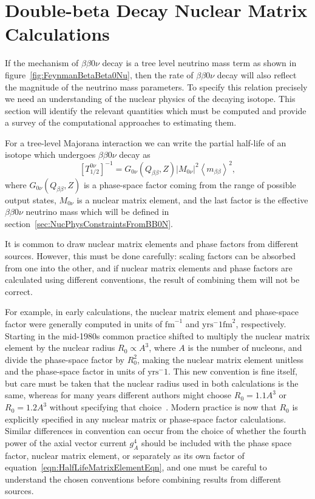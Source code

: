 \section{Double-beta Decay Nuclear Matrix Calculations}\label{sec:NuclearMatrixCalculations}

If the mechanism of $\beta\beta 0\nu$ decay is a tree level neutrino mass term as shown in figure~\ref{fig:FeynmanBetaBeta0Nu}, then the rate of $\beta\beta 0\nu$ decay will also reflect the magnitude of the neutrino mass parameters.  To specify this relation precisely we need an understanding of the nuclear physics of the decaying isotope.  This section will identify the relevant quantities which must be computed and provide a survey of the computational approaches to estimating them.

For a tree-level Majorana interaction we can write the partial half-life of an isotope which undergoes $\beta\beta 0\nu$ decay as
\begin{equation}\label{eqn:HalfLifeMatrixElementEqn}
\left[T^{0\nu}_{1/2}\right]^{-1} = G_{0\nu}(Q_{\beta\beta}, Z) \left| M_{0\nu}\right|^2 \left< m_{\beta\beta} \right>^2,
\end{equation}
where $G_{0\nu}(Q_{\beta\beta}, Z)$ is a phase-space factor coming from the range of possible output states, $M_{0\nu}$ is a nuclear matrix element, and the last factor is the effective $\beta\beta 0\nu$ neutrino mass which will be defined in section~\ref{sec:NucPhysConstraintsFromBB0N}.

It is common to draw nuclear matrix elements and phase factors from different sources.  However, this must be done carefully: scaling factors can be absorbed from one into the other, and if nuclear matrix elements and phase factors are calculated using different conventions, the result of combining them will not be correct.

For example, in early calculations, the nuclear matrix element and phase-space factor were generally computed in units of $\mathrm{fm}^{-1}$ and $\mathrm{yrs}^-1 \mathrm{fm}^2$, respectively.  Starting in the mid-1980s common practice shifted to multiply the nuclear matrix element by the nuclear radius $R_0 \propto A^3$, where $A$ is the number of nucleons, and divide the phase-space factor by $R_0^2$, making the nuclear matrix element unitless and the phase-space factor in units of $\mathrm{yrs}^-1$.  This new convention is fine itself, but care must be taken that the nuclear radius used in both calculations is the same, whereas for many years different authors might choose $R_0 = 1.1 A^3$ or $R_0 = 1.2 A^3$ without specifying that choice~\cite{PhysRevC.73.028501}.  Modern practice is now that $R_0$ is explicitly specified in any nuclear matrix or phase-space factor calculations.  Similar differences in convention can occur from the choice of whether the fourth power of the axial vector current $g_A^4$ should be included with the phase space factor, nuclear matrix element, or separately as its own factor of equation~\ref{eqn:HalfLifeMatrixElementEqn}, and one must be careful to understand the chosen conventions before combining results from different sources.~\cite{PhysRevC.87.014315}

